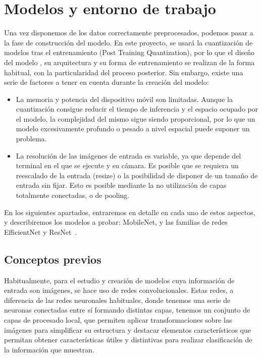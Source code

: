 \chapter{Modelos y entorno de trabajo}

Una vez disponemos de los datos correctamente preprocesados, podemos pasar a la fase de construcción del modelo. En este proyecto, se usará la cuantización de modelos tras el entrenamiento (Post Training Quantization), por lo que el diseño del modelo , su arquitectura y su forma de entrenamiento se realizan de la forma habitual, con la particularidad del proceso posterior. Sin embargo, existe una serie de factores a tener en cuenta durante la creación del modelo:

\begin{itemize}
	\item La memoria y potencia del dispositivo móvil son limitadas. Aunque la cuantización consigue reducir el tiempo de inferencia y el espacio ocupado por el modelo, la complejidad del mismo sigue siendo proporcional, por lo que un modelo excesivamente profundo o pesado a nivel espacial puede suponer un problema.
	\item La resolución de las imágenes de entrada es variable, ya que depende del terminal en el que se ejecute y su cámara. Es posible que se requiera un reescalado de la entrada (resize) o la posibilidad de disponer de un tamaño de entrada sin fijar. Esto es posible mediante la no utilización de capas totalmente conectadas, o de pooling.
\end{itemize}

En los siguientes apartados, entraremos en detalle en cada uno de estos aspectos, y describiremos los modelos a probar: MobileNet, y las familias de redes EfficientNet y ResNet~\cite{he2015deep}.

\section{Conceptos previos}

Habitualmente, para el estudio y creación de modelos cuya información de entrada son imágenes, se hace uso de redes convolucionales. Estas redes, a diferencia de las redes neuronales habituales, donde tenemos una serie de neuronas conectadas entre sí formando distintas capas,  tenemos un conjunto de capas de procesado local, que permiten aplicar transformaciones sobre las imágenes para simplificar su estructura y destacar elementos característicos que permitan obtener características útiles y distintivas para realizar clasificación de la información que muestran.

